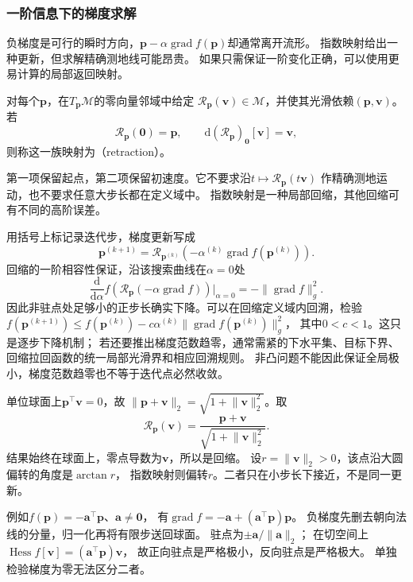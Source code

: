 \subsubsection{一阶信息下的梯度求解}
\label{sec:geometry-riemannian-gradient-method}

负梯度是可行的瞬时方向，$\bm p-\alpha\operatorname{grad}f(\bm p)$却通常离开流形。
指数映射给出一种更新，但求解精确测地线可能昂贵。
如果只需保证一阶变化正确，可以使用更易计算的局部返回映射。

\begin{definition}[回缩]
\label{def:geometry-retraction}
对每个$\bm p$，在$T_{\bm p}\mathcal M$的零向量邻域中给定
$\mathcal R_{\bm p}(\bm v)\in\mathcal M$，并使其光滑依赖$(\bm p,\bm v)$。
若
\[
 \mathcal R_{\bm p}(\bm0)=\bm p,\qquad
 \mathrm d(\mathcal R_{\bm p})_{\bm0}[\bm v]=\bm v,
\]
则称这一族映射为（retraction）。
\end{definition}
第一项保留起点，第二项保留初速度。它不要求沿$t\mapsto\mathcal R_{\bm p}(t\bm v)$
作精确测地运动，也不要求任意大步长都在定义域中。
指数映射是一种局部回缩，其他回缩可有不同的高阶误差。

用括号上标记录迭代步，梯度更新写成
\begin{equation}
 \bm p^{(k+1)}=\mathcal R_{\bm p^{(k)}}
       (-\alpha^{(k)}\operatorname{grad}f(\bm p^{(k)})).
 \label{eq:geometry-riemannian-gradient-step}
\end{equation}
回缩的一阶相容性保证，沿该搜索曲线在$\alpha=0$处
\[
 \frac{\mathrm d}{\mathrm d\alpha}
 f(\mathcal R_{\bm p}(-\alpha\operatorname{grad}f))
 \bigg|_{\alpha=0}=-\lVert\operatorname{grad}f\rVert_g^2.
\]
因此非驻点处足够小的正步长确实下降。可以在回缩定义域内回溯，检验
$f(\bm p^{(k+1)})\leq f(\bm p^{(k)})
-c\alpha^{(k)}\lVert\operatorname{grad}f(\bm p^{(k)})\rVert_g^2$，
其中$0<c<1$。这只是逐步下降机制；
若还要推出梯度范数趋零，通常需紧的下水平集、目标下界、
回缩拉回函数的统一局部光滑界和相应回溯规则。
非凸问题不能因此保证全局极小，梯度范数趋零也不等于迭代点必然收敛。

\begin{example}[球面上的归一化更新]
\label{ex:geometry-sphere-retraction}
单位球面上$\bm p^\top\bm v=0$，故
$\lVert\bm p+\bm v\rVert_2=\sqrt{1+\lVert\bm v\rVert_2^2}$。取
\begin{equation}
 \mathcal R_{\bm p}(\bm v)
 =\frac{\bm p+\bm v}{\sqrt{1+\lVert\bm v\rVert_2^2}}.
 \label{eq:geometry-sphere-retraction}
\end{equation}
结果始终在球面上，零点导数为$\bm v$，所以是回缩。
设$r=\lVert\bm v\rVert_2>0$，该点沿大圆偏转的角度是$\arctan r$，
指数映射则偏转$r$。二者只在小步长下接近，不是同一更新。

例如$f(\bm p)=-\bm a^\top\bm p$、$\bm a\neq\bm0$，
有$\operatorname{grad}f=-\bm a+(\bm a^\top\bm p)\bm p$。
负梯度先删去朝向法线的分量，归一化再将有限步送回球面。
驻点为$\pm\bm a/\lVert\bm a\rVert_2$；
在切空间上$\operatorname{Hess}f[\bm v]=(\bm a^\top\bm p)\bm v$，
故正向驻点是严格极小，反向驻点是严格极大。
单独检验梯度为零无法区分二者。
\end{example}


